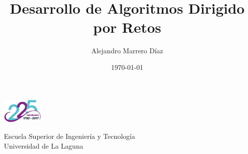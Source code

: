 \title[Desarrollo de Algoritmos Dirigido por Retos]{Desarrollo de Algoritmos Dirigido por Retos}
\author[Alejandro Marrero Díaz]{Alejandro Marrero Díaz}
\date[]{\today}
\begin{frame}
  \centering
  \includegraphics[width=0.15\textwidth]{img/ullesc.eps}
  \titlepage

  \begin{scriptsize}
    \begin{center}
     Escuela Superior de Ingeniería y Tecnología \\
     Universidad de La Laguna
    \end{center}
  \end{scriptsize}
\end{frame}
